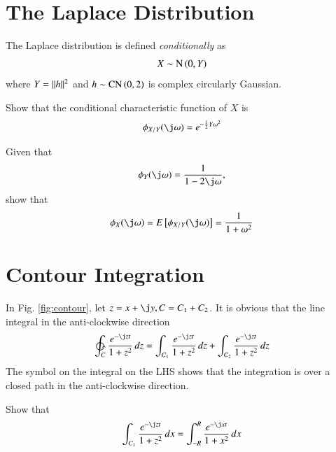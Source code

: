 \documentclass[journal,12pt,twocolumn]{IEEEtran}
\begin{document}
\section{The Laplace Distribution}
\begin{definition}
The Laplace distribution is defined {\em conditionally} as
\begin{equation}
 X \sim {\textrm {N}}\left(0 ,Y\right)
\end{equation}
where $Y = \lVert h\rVert^2$ and $h \sim \textrm {CN}\left(0,2\right)$ is complex circularly Gaussian.
\end{definition}
\begin{problem}
Show that the conditional characteristic function of $X$ is
\begin{equation}
\phi_{X/Y}(\j\omega) = e^{-\frac{1}{2}Y\omega^2}
\end{equation}
\end{problem}
\begin{problem}
Given that 
\begin{equation}
\phi_{Y}(\j\omega)  = \frac{1}{1-2\j\omega},
\end{equation}
show that
\begin{equation}
\phi_X(\j\omega) = E\sbrak{\phi_{X/Y}(\j\omega)} = \frac{1}{1+\omega^2}
\end{equation}
\end{problem}
\section{Contour Integration}
%
In Fig. \ref{fig:contour}, let $z = x + \j y, C = C_1+C_2$. It is obvious that the line integral in the anti-clockwise direction
\begin{equation}
\ointctrclockwise_C \frac{e^{-\j zt}}{1+z^2}\,dz = \int_{C_1} \frac{e^{-\j z t}}{1+z^2}\,dz + \int_{C_2} \frac{e^{-\j zt}}{1+z^2}\,dz
\end{equation}
%
The symbol on the integral on the LHS shows that the integration is over a closed path in the anti-clockwise direction.
\begin{problem}
Show that
\begin{equation}
\int_{C_1} \frac{e^{-\j z t}}{1+z^2}\,dx = \int_{-R}^{R} \frac{e^{-\j x t}}{1+x^2}\,dx
\end{equation}
\end{problem}

%
%
\end{document}

